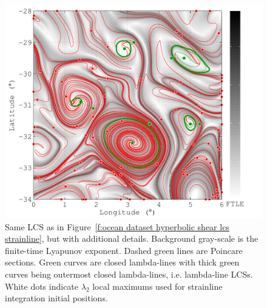 \documentclass{article}
\begin{document}
\begin{figure}
\begin{center}
\includegraphics[width=\textwidth]{graphics/ocean_dataset/hyperbolic_shear_lcs_details_strainline}
\end{center}
\caption{Same LCS as in Figure~\ref{f:ocean dataset hyperbolic shear lcs strainline}, but with additional details. Background gray-scale is the finite-time Lyapunov exponent. Dashed green lines are Poincare sections. Green curves are closed lambda-lines with thick green curves being outermost closed lambda-lines, i.e. lambda-line LCSs. White dots indicate $\lambda_2$ local maximums used for strainline integration initial positions.}
\label{f:ocean dataset hyperbolic shear lcs details strainline}
\end{figure}
\end{document}
